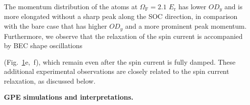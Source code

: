 \documentclass[showpacs,preprintnumbers,amsmath,amssymb, superscriptaddress, aps, reprint]{revtex4-1}
\def\E_r{E_{\text{r}}}
\def\OmegaF{\Omega_{\text{F}}}
\begin{document}
{{\begin{figure}[ht]
\label{Fig6_elong_shapeOsc}
\end{figure}
The momentum distribution of the atoms at $\OmegaF = 2.1$ $\E_r$ has lower $OD_y$ and is more elongated without a sharp peak along the SOC direction, in comparison with the bare case that has higher $OD_y$ and a more prominent peak momentum.
Furthermore, we observe that the relaxation of the spin current is accompanied by BEC shape oscillations} \cite{Stringari_Collective_PRL1996,Ketterle_Collective_PRL1996,Jin_Quadru_Temp_PRL1997} {(Fig.~{\ref{Fig6_elong_shapeOsc}}e,~f), which remain even after the spin current is fully damped. 
These additional experimental observations are closely related to the spin current relaxation, as discussed below.}


\vspace{5mm}

\textbf{GPE simulations and interpretations.}

}
\end{document}
